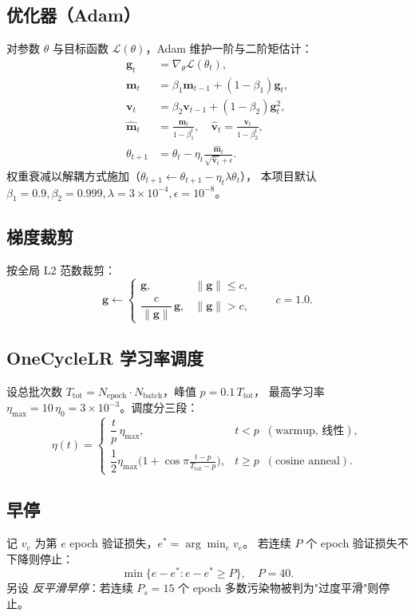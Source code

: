 \documentclass[11pt,a4paper]{article}
\newcommand{\vect}[1]{\bm{#1}}
\begin{document}
\subsection{优化器（Adam）}
对参数 $\theta$ 与目标函数 $\mathcal{L}(\theta)$，Adam 维护一阶与二阶矩估计：
\begin{align}
\vect{g}_t &= \nabla_{\theta} \mathcal{L}(\theta_t),\\
\vect{m}_t &= \beta_1 \vect{m}_{t-1} + (1 - \beta_1)\vect{g}_t,\\
\vect{v}_t &= \beta_2 \vect{v}_{t-1} + (1 - \beta_2)\vect{g}_t^2,\\
\widehat{\vect{m}}_t &= \frac{\vect{m}_t}{1 - \beta_1^{t}},\quad
\widehat{\vect{v}}_t = \frac{\vect{v}_t}{1 - \beta_2^{t}},\\
\theta_{t+1} &= \theta_t - \eta_t \frac{\widehat{\vect{m}}_t}{\sqrt{\widehat{\vect{v}}_t} + \epsilon}.
\end{align}
权重衰减以解耦方式施加（$\theta_{t+1} \leftarrow \theta_{t+1} - \eta_t \lambda \theta_t$），
本项目默认 $\beta_1 = 0.9, \beta_2 = 0.999, \lambda = 3\times 10^{-4}, \epsilon = 10^{-8}$。

\subsection{梯度裁剪}
按全局 L2 范数裁剪：
\[
\vect{g} \leftarrow \begin{cases}
\vect{g}, & \|\vect{g}\| \le c,\\
\dfrac{c}{\|\vect{g}\|}\,\vect{g}, & \|\vect{g}\| > c,
\end{cases}
\qquad c = 1.0.
\]

\subsection{OneCycleLR 学习率调度}
设总批次数 $T_{\text{tot}} = N_{\text{epoch}} \cdot N_{\text{batch}}$，峰值 $p = 0.1\,T_{\text{tot}}$，
最高学习率 $\eta_{\max} = 10\,\eta_0 = 3\times 10^{-3}$。调度分三段：
\[
\eta(t) =
\begin{cases}
\dfrac{t}{p}\,\eta_{\max}, & t < p \;\;(\text{warmup, 线性}),\\
\dfrac{1}{2}\eta_{\max}\bigl(1 + \cos\pi \tfrac{t - p}{T_{\text{tot}} - p}\bigr), & t \ge p \;\;(\text{cosine anneal}).
\end{cases}
\]

\subsection{早停}
记 $v_e$ 为第 $e$ epoch 验证损失，$e^{*} = \arg\min_e v_e$。
若连续 $P$ 个 epoch 验证损失不下降则停止：
\[
\min\bigl\{e - e^{*} : e - e^{*} \ge P\bigr\},\quad P = 40.
\]
另设 \emph{反平滑早停}：若连续 $P_s = 15$ 个 epoch 多数污染物被判为"过度平滑"则停止。
\end{document}

